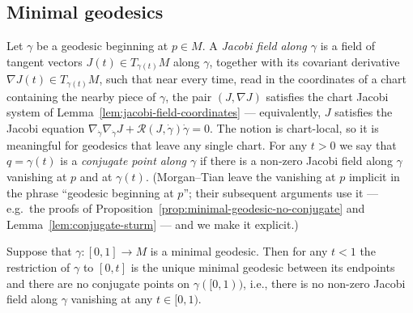\subsection{Minimal geodesics}

\begin{definition}
\label{def:conjugate-point}
\leanok
Let $\gamma$ be a geodesic beginning at $p\in M$. A {\sl Jacobi field
along $\gamma$} is a field of tangent vectors $J(t)\in T_{\gamma(t)}M$
along $\gamma$, together with its covariant derivative
$\nabla J(t)\in T_{\gamma(t)}M$, such that near every time, read in the
coordinates of a chart containing the nearby piece of $\gamma$, the pair
$(J,\nabla J)$ satisfies the chart Jacobi system of
Lemma~\ref{lem:jacobi-field-coordinates} — equivalently, $J$ satisfies
the Jacobi equation
$\nabla_{\dot\gamma}\nabla_{\dot\gamma}J
+{\mathcal R}(J,\dot\gamma)\dot\gamma=0$. The notion is chart-local, so
it is meaningful for geodesics that leave any single chart. For any
$t>0$ we say that $q=\gamma(t)$ is a {\sl conjugate point along
$\gamma$} if there is a non-zero Jacobi field
along $\gamma$ vanishing at $p$ and at $\gamma(t)$. (Morgan--Tian leave
the vanishing at $p$ implicit in the phrase ``geodesic beginning at
$p$''; their subsequent arguments use it — e.g.\ the proofs of
Proposition~\ref{prop:minimal-geodesic-no-conjugate} and
Lemma~\ref{lem:conjugate-sturm} — and we make it explicit.)
\end{definition}


\begin{proposition}
\label{prop:minimal-geodesic-no-conjugate}
\label{jacmin}
\leanok
Suppose that $\gamma\colon [0,1]\to M$ is a minimal geodesic. Then
for any $t<1$ the restriction of $\gamma$ to $[0,t]$ is the unique
minimal geodesic between its endpoints and there are no conjugate
points on $\gamma([0,1))$, i.e., there is no non-zero Jacobi field
along $\gamma$ vanishing at any $t\in [0,1)$.
\end{proposition}

